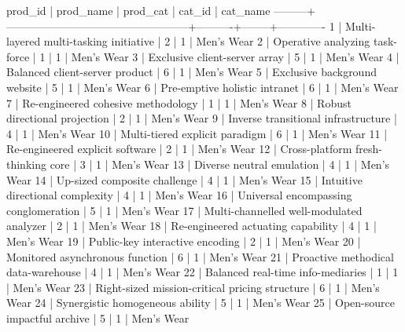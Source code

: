 \begin{enumerate}
\begin{pseudo*}
 prod_id |                    prod_name                     | prod_cat | cat_id |  cat_name     
---------+--------------------------------------------------+----------+--------+-------------  
       1 | Multi-layered multi-tasking initiative           |        2 |      1 | Men's Wear    
       2 | Operative analyzing task-force                   |        1 |      1 | Men's Wear    
       3 | Exclusive client-server array                    |        5 |      1 | Men's Wear    
       4 | Balanced client-server product                   |        6 |      1 | Men's Wear    
       5 | Exclusive background website                     |        5 |      1 | Men's Wear    
       6 | Pre-emptive holistic intranet                    |        6 |      1 | Men's Wear    
       7 | Re-engineered cohesive methodology               |        1 |      1 | Men's Wear    
       8 | Robust directional projection                    |        2 |      1 | Men's Wear    
       9 | Inverse transitional infrastructure              |        4 |      1 | Men's Wear    
      10 | Multi-tiered explicit paradigm                   |        6 |      1 | Men's Wear    
      11 | Re-engineered explicit software                  |        2 |      1 | Men's Wear    
      12 | Cross-platform fresh-thinking core               |        3 |      1 | Men's Wear    
      13 | Diverse neutral emulation                        |        4 |      1 | Men's Wear    
      14 | Up-sized composite challenge                     |        4 |      1 | Men's Wear    
      15 | Intuitive directional complexity                 |        4 |      1 | Men's Wear    
      16 | Universal encompassing conglomeration            |        5 |      1 | Men's Wear    
      17 | Multi-channelled well-modulated analyzer         |        2 |      1 | Men's Wear    
      18 | Re-engineered actuating capability               |        4 |      1 | Men's Wear    
      19 | Public-key interactive encoding                  |        2 |      1 | Men's Wear    
      20 | Monitored asynchronous function                  |        6 |      1 | Men's Wear    
      21 | Proactive methodical data-warehouse              |        4 |      1 | Men's Wear    
      22 | Balanced real-time info-mediaries                |        1 |      1 | Men's Wear    
      23 | Right-sized mission-critical pricing structure   |        6 |      1 | Men's Wear    
      24 | Synergistic homogeneous ability                  |        5 |      1 | Men's Wear    
      25 | Open-source impactful archive                    |        5 |      1 | Men's Wear    

\end{pseudo*}
\end{enumerate}
